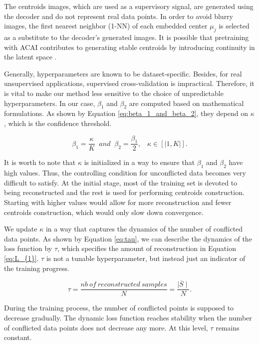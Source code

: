\documentclass{article}
\begin{document}
The centroids images, which are used as a supervisory signal, are generated using the decoder and do not represent real data points. In order to avoid blurry images, the first nearest neighbor (1-NN) of each embedded center $\mu_{j}$ is selected as a substitute to the decoder's generated images. It is possible that pretraining with ACAI contributes to generating stable centroids by introducing continuity in the latent space \cite{paper5}.

Generally, hyperparameters are known to be dataset-specific. Besides, for real unsupervised applications, supervised cross-validation is impractical. Therefore, it is vital to make our method less sensitive to the choice of unpredictable hyperparameters. In our case, $\beta_{1}$ and $\beta_{2}$ are computed based on mathematical formulations. As shown by Equation \ref{eq:beta_1_and_beta_2}, they depend on $\kappa$, which is the confidence threshold.  

\begin{equation}\label{eq:beta_1_and_beta_2}
    \beta_{1} = \frac{\kappa}{K} \;\; and \;\; \beta_{2} = \frac{\beta_{1}}{2},\;\;\; \kappa \in [|1,K|].
\end{equation}

It is worth to note that $\kappa$ is initialized in a way to ensure that $\beta_{1}$ and $\beta_{2}$ have high values. Thus, the controlling condition for unconflicted data becomes very difficult to satisfy. At the initial stage, most of the training set is devoted to being reconstructed and the rest is used for performing centroids construction. Starting with higher values would allow for more reconstruction and fewer centroids construction, which would only slow down convergence. 

We update $\kappa$ in a way that captures the dynamics of the number of conflicted data points. As shown by Equation \ref{eq:tau}, we can describe the dynamics of the loss function by $\tau$, which specifies the amount of reconstruction in Equation \ref{eq:L_{1}}. $\tau$ is not a tunable hyperparameter, but instead just an indicator of the training progress.

\begin{equation}\label{eq:tau}
    \tau = \frac{nb \: of \: reconstructed \: samples}{N} = \frac{\mid\overline{S}\mid}{N}.
\end{equation}

During the training process, the number of conflicted points is supposed to decrease gradually. The dynamic loss function reaches stability when the number of conflicted data points does not decrease any more. At this level, $\tau$ remains constant.
\end{document}
